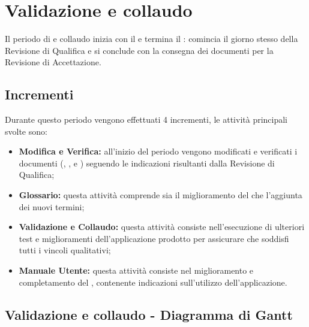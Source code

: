 \documentclass[PianoDiProgetto.tex]{subfiles}
\begin{document}
\section{Validazione e collaudo}
Il periodo di  e collaudo inizia con il  e termina il : comincia il giorno stesso della Revisione di Qualifica e si conclude con la consegna dei documenti per la Revisione di Accettazione.
\subsection{Incrementi}
Durante questo periodo vengono effettuati 4 incrementi, le attività principali svolte sono:
\begin{itemize}
\item \textbf{Modifica e Verifica:} all'inizio del periodo vengono modificati e verificati  i documenti (\ndp, \pdp, \pdq e \pb) seguendo le indicazioni risultanti dalla Revisione di Qualifica;
\item \textbf{Glossario:} questa attività comprende sia il miglioramento del \g che l'aggiunta dei nuovi termini;
\item \textbf{Validazione e Collaudo:} questa attività consiste nell'esecuzione di ulteriori test e miglioramenti dell'applicazione prodotto per assicurare che soddisfi tutti i vincoli qualitativi;
\item \textbf{Manuale Utente:} questa attività consiste nel miglioramento e completamento del \mut, contenente indicazioni sull'utilizzo dell'applicazione.

\end{itemize}
\begin{landscape}
\subsection{Validazione e collaudo - Diagramma di Gantt}
\end{landscape}	
\end{document}
